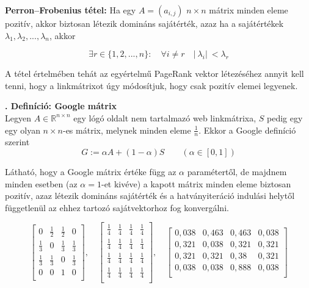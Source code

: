 \documentclass[12pt,a4paper]{article}
\newcounter{definicioszam}
\newenvironment{definicio}[1]
{{\medskip}\noindent \stepcounter{definicioszam}
{\bfseries{\thedefinicioszam. Definíció: #1\\[1ex]}}}{\bigskip }
\begin{document}
\vspace{0.1cm}
\textbf{Perron–Frobenius tétel:} Ha egy $A = (a_{i,j})$ $n \times n$ mátrix minden eleme pozitív, akkor biztosan létezik domináns sajátérték, azaz ha a sajátértékek $\lambda_1 , \lambda_2 , ... , \lambda_n$, akkor

\[ \exists r \in \{1,2,...,n\}: \quad \forall i \neq r \quad |\ \lambda_i |\ < \lambda_r  \]

A tétel értelmében tehát az egyértelmű PageRank vektor létezéséhez annyit kell tenni, hogy a linkmátrixot úgy módosítjuk, hogy csak pozitív elemei legyenek.

\begin{definicio}{Google mátrix}
	Legyen $A \in \mathbb{R}^{n \times n}$ egy lógó oldalt nem tartalmazó web linkmátrixa, $S$ pedig egy egy olyan $n \times n$-es mátrix, melynek minden eleme $\frac{1}{n}$. Ekkor a Google definíció szerint
	\[ G := \alpha A + (1-\alpha) S \qquad (\alpha \in [0,1]) \]
\end{definicio}
\vspace{-1cm}

Látható, hogy a Google mátrix értéke függ az $\alpha$ paramétertől, de majdnem minden esetben (az $\alpha = 1$-et kivéve) a kapott mátrix minden eleme biztosan pozitív, azaz létezik domináns sajátérték és a hatványiteráció indulási helytől függetlenül az ehhez tartozó sajátvektorhoz fog konvergálni.

\[
\begin{bmatrix}
0 & \frac{1}{2} & \frac{1}{2} & 0 \\
\frac{1}{3} & 0 & \frac{1}{3} & \frac{1}{3} \\
\frac{1}{3} & \frac{1}{3} & 0 & \frac{1}{3} \\
0 & 0 & 1 & 0 \\
\end{bmatrix}, \quad
\begin{bmatrix}
\frac{1}{4} & \frac{1}{4} & \frac{1}{4} & \frac{1}{4} \\
\frac{1}{4} & \frac{1}{4} & \frac{1}{4} & \frac{1}{4} \\
\frac{1}{4} & \frac{1}{4} & \frac{1}{4} & \frac{1}{4} \\
\frac{1}{4} & \frac{1}{4} & \frac{1}{4} & \frac{1}{4} \\
\end{bmatrix}, \quad
\begin{bmatrix}
0,038 & 0,463 & 0,463 & 0,038 \\
0,321 & 0,038 & 0,321 & 0,321 \\
0,321 & 0,321 & 0,38 & 0,321 \\
0,038 & 0,038 & 0,888 & 0,038 \\
\end{bmatrix}
\]
\end{document}
